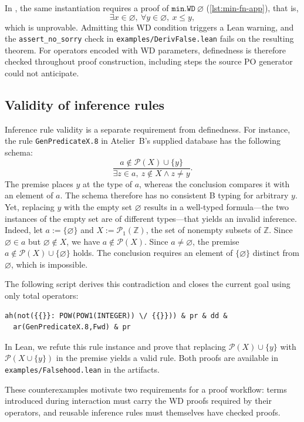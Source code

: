 In \barrel, the same instantiation requires a proof of \(\mathtt{min.WD}\ \varnothing\) (\cref{lst:min-fn-app}), that is,
\[
	\exists x \in \varnothing,\ \forall y \in \varnothing,\ x \le y,
\]
which is unprovable.
Admitting this WD condition triggers a Lean warning, and the \texttt{assert\_no\_sorry} check in \texttt{examples/DerivFalse.lean} fails on the resulting theorem.
For operators encoded with WD parameters, definedness is therefore checked throughout proof construction, including steps the source PO generator could not anticipate.

\subsection{Validity of inference rules}
\label{sec:checked-rules}

Inference rule validity is a separate requirement from definedness.
For instance, the rule \texttt{GenPredicateX.8} in Atelier~B's supplied database has the following schema:
\[
	\frac{a \notin \mathcal{P}(X) \cup \{y\}}
	{\exists z\in a,\ z\notin X \land z\ne y}.
\]
The premise places $y$ at the type of $a$, whereas the conclusion compares it with an element of $a$.
The schema therefore has no consistent B typing for arbitrary \(y\).
Yet, replacing \(y\) with the empty set \(\varnothing\) results in a well-typed formula---the two instances of the empty set are of different types---that yields an invalid inference.
%
Indeed, let $a := \{\varnothing\}$ and $X := \mathcal{P}_1(\mathbb{Z})$, the set of nonempty subsets of $\mathbb{Z}$.
Since ${\varnothing \in a}$ but $\varnothing \notin X$, we have $a \notin \mathcal{P}(X)$. Since $a \ne \varnothing$,
the premise $a\notin\mathcal{P}(X)\cup\{\varnothing\}$ holds.
The conclusion requires an element of $\{\varnothing\}$ distinct from $\varnothing$, which is impossible.

The following script derives this contradiction and closes the current goal using only total operators:
\begin{lstlisting}[language=b, basicstyle=\small\ttfamily, numbers=none, mathescape=false, escapeinside={}]
ah(not({{}}: POW(POW1(INTEGER)) \/ {{}})) & pr & dd &
  ar(GenPredicateX.8,Fwd) & pr
\end{lstlisting}

In Lean, we refute this rule instance and prove that replacing \(\mathcal{P}(X) \cup\{y\}\) with $\mathcal{P}(X\cup\{y\})$ in the premise yields a valid rule.
Both proofs are available in \texttt{examples/Falsehood.lean} in the artifacts.

These counterexamples motivate two requirements for a proof workflow: terms introduced during interaction must carry the WD proofs required by their operators, and reusable inference rules must themselves have checked proofs.
